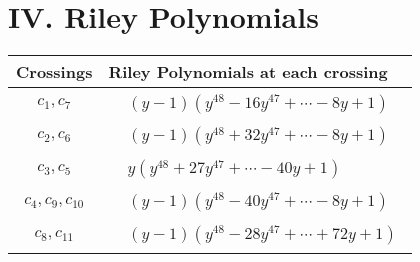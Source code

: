 \documentclass[1p]{elsarticle_modified}
\theoremstyle{definition}
\begin{document}
\centering \section*{ IV. Riley Polynomials}
\begin{tabular}{m{50pt}|m{274pt}}
Crossings & \hspace{64pt}Riley Polynomials at each crossing \\
\hline $$\begin{aligned}c_{1},c_{7}\end{aligned}$$&$\begin{aligned}
&(y-1)(y^{48}-16 y^{47}+\cdots-8 y+1)
\end{aligned}$\\
\hline $$\begin{aligned}c_{2},c_{6}\end{aligned}$$&$\begin{aligned}
&(y-1)(y^{48}+32 y^{47}+\cdots-8 y+1)
\end{aligned}$\\
\hline $$\begin{aligned}c_{3},c_{5}\end{aligned}$$&$\begin{aligned}
&y(y^{48}+27 y^{47}+\cdots-40 y+1)
\end{aligned}$\\
\hline $$\begin{aligned}c_{4},c_{9},c_{10}\end{aligned}$$&$\begin{aligned}
&(y-1)(y^{48}-40 y^{47}+\cdots-8 y+1)
\end{aligned}$\\
\hline $$\begin{aligned}c_{8},c_{11}\end{aligned}$$&$\begin{aligned}
&(y-1)(y^{48}-28 y^{47}+\cdots+72 y+1)
\end{aligned}$\\
\hline
\end{tabular}
\vskip 2pc
\end{document}
